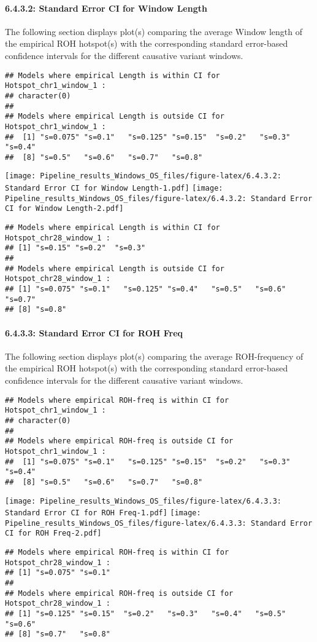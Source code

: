 \documentclass[
]{article}
\begin{document}
\paragraph{6.4.3.2: Standard Error CI for Window
Length}\label{standard-error-ci-for-window-length}

The following section displays plot(s) comparing the average Window
length of the empirical ROH hotspot(s) with the corresponding standard
error-based confidence intervals for the different causative variant
windows.

\begin{verbatim}
## Models where empirical Length is within CI for Hotspot_chr1_window_1 :
## character(0)
## 
## Models where empirical Length is outside CI for Hotspot_chr1_window_1 :
##  [1] "s=0.075" "s=0.1"   "s=0.125" "s=0.15"  "s=0.2"   "s=0.3"   "s=0.4"  
##  [8] "s=0.5"   "s=0.6"   "s=0.7"   "s=0.8"
\end{verbatim}

\texttt{[image: Pipeline\_results\_Windows\_OS\_files/figure-latex/6.4.3.2: Standard Error CI for Window Length-1.pdf]}
\texttt{[image: Pipeline\_results\_Windows\_OS\_files/figure-latex/6.4.3.2: Standard Error CI for Window Length-2.pdf]}

\begin{verbatim}
## Models where empirical Length is within CI for Hotspot_chr28_window_1 :
## [1] "s=0.15" "s=0.2"  "s=0.3" 
## 
## Models where empirical Length is outside CI for Hotspot_chr28_window_1 :
## [1] "s=0.075" "s=0.1"   "s=0.125" "s=0.4"   "s=0.5"   "s=0.6"   "s=0.7"  
## [8] "s=0.8"
\end{verbatim}

\paragraph{6.4.3.3: Standard Error CI for ROH
Freq}\label{standard-error-ci-for-roh-freq}

The following section displays plot(s) comparing the average
ROH-frequency of the empirical ROH hotspot(s) with the corresponding
standard error-based confidence intervals for the different causative
variant windows.

\begin{verbatim}
## Models where empirical ROH-freq is within CI for Hotspot_chr1_window_1 :
## character(0)
## 
## Models where empirical ROH-freq is outside CI for Hotspot_chr1_window_1 :
##  [1] "s=0.075" "s=0.1"   "s=0.125" "s=0.15"  "s=0.2"   "s=0.3"   "s=0.4"  
##  [8] "s=0.5"   "s=0.6"   "s=0.7"   "s=0.8"
\end{verbatim}

\texttt{[image: Pipeline\_results\_Windows\_OS\_files/figure-latex/6.4.3.3: Standard Error CI for ROH Freq-1.pdf]}
\texttt{[image: Pipeline\_results\_Windows\_OS\_files/figure-latex/6.4.3.3: Standard Error CI for ROH Freq-2.pdf]}

\begin{verbatim}
## Models where empirical ROH-freq is within CI for Hotspot_chr28_window_1 :
## [1] "s=0.075" "s=0.1"  
## 
## Models where empirical ROH-freq is outside CI for Hotspot_chr28_window_1 :
## [1] "s=0.125" "s=0.15"  "s=0.2"   "s=0.3"   "s=0.4"   "s=0.5"   "s=0.6"  
## [8] "s=0.7"   "s=0.8"
\end{verbatim}
\end{document}
